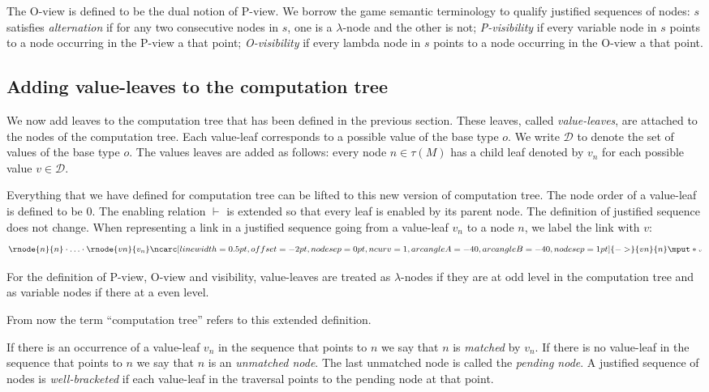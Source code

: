 \documentclass{llncs}
\newcommand{\bkptr}[2][nodesep=0pt]{\ncarc[linewidth=0.5pt,offset=-2pt,nodesep=0pt,ncurv=1,arcangleA=-#2, arcangleB=-#2,#1]{->}}
\newcommand{\bklabel}[1]{\mput*{\mbox{{\tiny $#1$}}}}
\begin{document}
The O-view is defined to be the dual notion of P-view.
We borrow the game semantic terminology to qualify justified sequences of nodes:
$s$ satisfies \emph{alternation} if for any two consecutive nodes in $s$, one is a $\lambda$-node
and the other is not; \emph{P-visibility} if every variable node in $s$ points to a node occurring in the P-view a that point; \emph{O-visibility} if every lambda node in $s$ points to a node occurring in the O-view a that point.

\subsection{Adding value-leaves to the computation tree}
\label{sec:adding_value_leaves}

We now add leaves to the computation tree that has been defined in the previous section.
These leaves, called \emph{value-leaves}, are attached to the nodes of the computation tree. Each
value-leaf corresponds to a possible value of the base type $o$.
We write $\mathcal{D}$ to denote the set of values of the base type
$o$. The values leaves are added as follows: every
node $n \in \tau(M)$ has a child leaf denoted by $v_n$ for each possible value $v \in \mathcal{D}$.

Everything that we have defined for computation tree can be lifted
to this new version of computation tree. The node order of a
value-leaf is defined to be $0$. The enabling relation $\vdash$ is
extended so that every leaf is enabled by its parent node. The
definition of justified sequence does not change.
When representing a link in a justified sequence going from a value-leaf $v_n$ to a node $n$,
we label the link with $v$:
$$
\rnode{n}{n} \cdot \ldots \cdot \rnode{vn}{v_n} \bkptr[nodesep=1pt]{40}{vn}{n} \bklabel{v}
$$


For the definition
of P-view, O-view and visibility, value-leaves are treated as
$\lambda$-nodes if they are at odd level in the computation tree and
as variable nodes if there at a even level.

From now the term ``computation tree'' refers to this extended
definition.
\vspace{10pt}

If there is an occurrence of a value-leaf $v_n$ in the sequence that points to $n$ we say that
$n$ is \emph{matched} by $v_n$. If there is no value-leaf in the sequence that points to $n$ we
say that $n$ is an \emph{unmatched node}.
The last unmatched node is called the \emph{pending node}.
A justified sequence of nodes is \emph{well-bracketed} if
each value-leaf in the traversal points to the pending node at that point.
\end{document}
